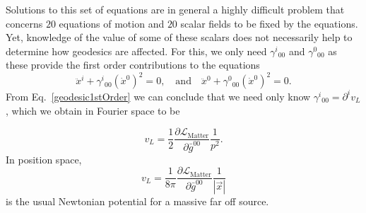 \documentclass[twocolumn,aps,
  showpacs,showkeys,prd,superscriptaddress]{revtex4-1}
\begin{document}
Solutions to this set of equations are in general a highly difficult problem that concerns $20$ equations of motion and $20$ scalar fields to be fixed by the equations. Yet, knowledge of the value of some of these scalars does not necessarily help to determine how geodesics are affected. For this, we only need $\gamma^i{}_{00}$ and $\gamma^0{}_{00}$ as these provide the first order contributions to the equations
\begin{equation}
  \label{geodesic1stOrder}
  \ddot{x}^i + \gamma^i{}_{00}(\dot{x}^0)^2 = 0,
  \quad \text{and} \quad
  \ddot{x}^0 + \gamma^0{}_{00}(\dot{x}^0)^2 = 0.
\end{equation}
From Eq.~\eqref{geodesic1stOrder} we can conclude that we need only know $\gamma^i{}_{00} = \partial^i v_L$, which we obtain in Fourier space to be

\begin{equation}
  v_L=\frac{1}{2}\frac{\partial\mathcal{L}_{\text{Matter}}}{\partial\bar{g}^{00}}\frac{1}{p^2}.
\end{equation}
In position space, 
\begin{equation}
  v_L = \frac{1}{8\pi} \frac{ \partial\mathcal{L}_{\text{Matter}} }{ \partial \bar{g}^{00} } \frac{1}{|\vec{x}|}
\end{equation}
is the usual Newtonian potential for a massive far off source.




\end{document}
